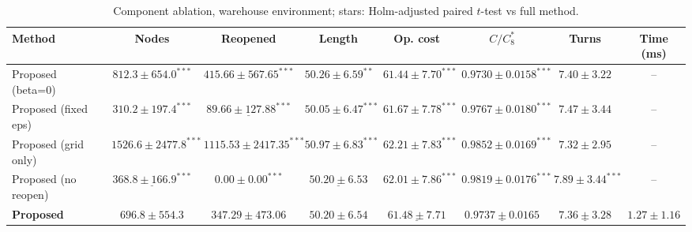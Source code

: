 \begin{table}[htbp]
\centering\small
\caption{Component ablation, warehouse environment; stars: Holm-adjusted paired $t$-test vs full method.}\label{tab:abl_warehouse}
\begin{tabular}{lccccccc}
\toprule
Method & Nodes & Reopened & Length & Op. cost & $C/C^*_8$ & Turns & Time (ms) \\
\midrule
Proposed (beta=0) & $812.3\pm654.0^{***}$ & $415.66\pm567.65^{***}$ & $50.26\pm6.59^{**}$ & $\mathbf{61.44\pm7.70^{***}}$ & $\mathbf{0.9730\pm0.0158^{***}}$ & $7.40\pm3.22$ & -- \\
Proposed (fixed eps) & $\mathbf{310.2\pm197.4^{***}}$ & $\underline{89.66\pm127.88^{***}}$ & $\mathbf{50.05\pm6.47^{***}}$ & $61.67\pm7.78^{***}$ & $0.9767\pm0.0180^{***}$ & $7.47\pm3.44$ & -- \\
Proposed (grid only) & $1526.6\pm2477.8^{***}$ & $1115.53\pm2417.35^{***}$ & $50.97\pm6.83^{***}$ & $62.21\pm7.83^{***}$ & $0.9852\pm0.0169^{***}$ & $\mathbf{7.32\pm2.95}$ & -- \\
Proposed (no reopen) & $\underline{368.8\pm166.9^{***}}$ & $\mathbf{0.00\pm0.00^{***}}$ & $\underline{50.20\pm6.53}$ & $62.01\pm7.86^{***}$ & $0.9819\pm0.0176^{***}$ & $7.89\pm3.44^{***}$ & -- \\
\textbf{Proposed} & $696.8\pm554.3$ & $347.29\pm473.06$ & $50.20\pm6.54$ & $\underline{61.48\pm7.71}$ & $\underline{0.9737\pm0.0165}$ & $\underline{7.36\pm3.28}$ & $\mathbf{1.27\pm1.16}$ \\
\bottomrule
\end{tabular}
\end{table}
